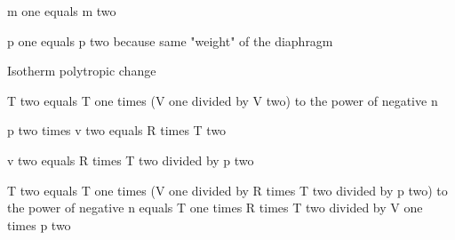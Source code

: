 m one equals m two

p one equals p two because same "weight" of the diaphragm

Isotherm polytropic change

T two equals T one times (V one divided by V two) to the power of negative n

p two times v two equals R times T two

v two equals R times T two divided by p two

T two equals T one times (V one divided by R times T two divided by p two) to the power of negative n equals T one times R times T two divided by V one times p two